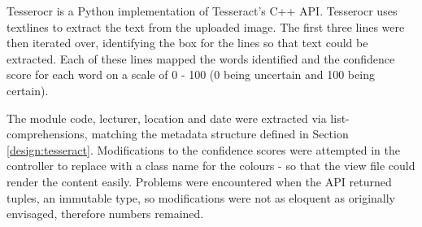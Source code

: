 {{{{{{{Tesserocr is a Python implementation of Tesseract's  C++ API. Tesserocr uses textlines to extract the text from the uploaded image. The first three lines were then iterated over, identifying the box for the lines so that text could be extracted. Each of these lines mapped the words identified and the confidence score for each word on a scale of 0 - 100 (0 being uncertain and 100 being certain).

The module code, lecturer, location and date were extracted via list-comprehensions, matching the metadata structure defined in Section \ref{design:tesseract}. Modifications to the confidence scores were attempted in the controller to replace with a class name for the colours - so that the view file could render the content easily. Problems were encountered when the API returned tuples, an immutable type, so modifications were not as eloquent as originally envisaged, therefore numbers remained.

}}}}}}}
